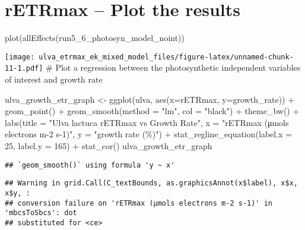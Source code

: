 \documentclass[
]{article}
\newenvironment{Shaded}{\begin{snugshade}}{\end{snugshade}}
\newcommand{\AttributeTok}[1]{\textcolor[rgb]{0.77,0.63,0.00}{#1}}
\newcommand{\DecValTok}[1]{\textcolor[rgb]{0.00,0.00,0.81}{#1}}
\newcommand{\FunctionTok}[1]{\textcolor[rgb]{0.00,0.00,0.00}{#1}}
\newcommand{\NormalTok}[1]{#1}
\newcommand{\OtherTok}[1]{\textcolor[rgb]{0.56,0.35,0.01}{#1}}
\newcommand{\SpecialCharTok}[1]{\textcolor[rgb]{0.00,0.00,0.00}{#1}}
\newcommand{\StringTok}[1]{\textcolor[rgb]{0.31,0.60,0.02}{#1}}
\begin{document}
\hypertarget{retrmax-plot-the-results}{%
\section{rETRmax -- Plot the results}\label{retrmax-plot-the-results}}

\begin{Shaded}
\begin{Highlighting}[]
\FunctionTok{plot}\NormalTok{(}\FunctionTok{allEffects}\NormalTok{(run5\_6\_photosyn\_model\_noint))}
\end{Highlighting}
\end{Shaded}

\texttt{[image: ulva\_etrmax\_ek\_mixed\_model\_files/figure-latex/unnamed-chunk-11-1.pdf]}
\# Plot a regression between the photosynthetic independent variables of
interest and growth rate

\begin{Shaded}
\begin{Highlighting}[]
\NormalTok{ulva\_growth\_etr\_graph }\OtherTok{\textless{}{-}} \FunctionTok{ggplot}\NormalTok{(ulva, }\FunctionTok{aes}\NormalTok{(}\AttributeTok{x=}\NormalTok{rETRmax, }\AttributeTok{y=}\NormalTok{growth\_rate)) }\SpecialCharTok{+} \FunctionTok{geom\_point}\NormalTok{() }\SpecialCharTok{+} 
  \FunctionTok{geom\_smooth}\NormalTok{(}\AttributeTok{method =} \StringTok{"lm"}\NormalTok{, }\AttributeTok{col =} \StringTok{"black"}\NormalTok{) }\SpecialCharTok{+} \FunctionTok{theme\_bw}\NormalTok{() }\SpecialCharTok{+} 
  \FunctionTok{labs}\NormalTok{(}\AttributeTok{title =} \StringTok{"Ulva lactuca rETRmax vs Growth Rate"}\NormalTok{, }\AttributeTok{x =} \StringTok{"rETRmax (μmols electrons m{-}2 s{-}1)"}\NormalTok{, }
       \AttributeTok{y =} \StringTok{"growth rate (\%)"}\NormalTok{) }\SpecialCharTok{+} \FunctionTok{stat\_regline\_equation}\NormalTok{(}\AttributeTok{label.x =} \DecValTok{25}\NormalTok{, }\AttributeTok{label.y =} \DecValTok{165}\NormalTok{) }\SpecialCharTok{+} \FunctionTok{stat\_cor}\NormalTok{()}
\NormalTok{ulva\_growth\_etr\_graph}
\end{Highlighting}
\end{Shaded}

\begin{verbatim}
## `geom_smooth()` using formula 'y ~ x'
\end{verbatim}

\begin{verbatim}
## Warning in grid.Call(C_textBounds, as.graphicsAnnot(x$label), x$x, x$y, :
## conversion failure on 'rETRmax (μmols electrons m-2 s-1)' in 'mbcsToSbcs': dot
## substituted for <ce>
\end{verbatim}
\end{document}
